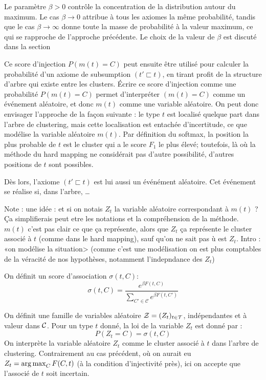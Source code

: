 Le paramètre $\beta > 0$ contrôle la concentration de la distribution autour du maximum. Le cas $\beta \rightarrow 0$ attribue à tous les axiomes la même probabilité, tandis que le cas $\beta \rightarrow \infty$ donne toute la masse de probabilité à la valeur maximum, ce qui se rapproche de l'approche précédente. Le choix de la valeur de $\beta$ est discuté dans la section 

Ce score d'injection $P(m(t) = C)$ peut ensuite être utilisé pour calculer la probabilité d'un axiome de subsumption $(t' \sqsubset t)$, en tirant profit de la structure d'arbre qui existe entre les clusters. 
Écrire ce score d'injection comme une probabilité $P(m(t) = C)$ permet d'interpréter $(m(t) = C)$ comme un événement aléatoire, et donc $m(t)$ comme une variable aléatoire. On peut donc envisager l'approche de la façon suivante : le type $t$ est localisé quelque part dans l'arbre de clustering, mais cette localisation est entachée d'incertitude, ce que modélise la variable aléatoire $m(t)$. Par définition du softmax, la position la plus probable de $t$ est le cluster qui a le score $F_1$ le plus élevé; toutefois, là où la méthode du hard mapping ne considérait pas d'autre possibilité, d'autres positions de $t$ sont possibles. 

Dès lors, l'axiome $(t' \sqsubset t)$ est lui aussi un événément aléatoire. Cet événement se réalise si, dans l'arbre, \ldots

Note : une idée : et si on notais $Z_t$ la variable aléatoire correspondant à $m(t)$ ? Ça simplifierais peut etre les notations et la compréhension de la méthode. $m(t)$ c'est pas clair ce que ça représente, alors que $Z_t$ ça représente le cluster associé à $t$ (comme dans le hard mapping), sauf qu'on ne sait pas ù est $Z_t$. Intro : «on modélise la situation> (comme c'est une modélisation on est plus comptables de la véracité de nos hypothèses, notamment l'indepndance des $Z_t$)

On définit un score d'association $\sigma(t, C)$:
\begin{equation}
    \sigma(t, C) = \frac{\displaystyle e^{ \beta F(t, C)}}{\displaystyle \sum_{C' \in \mathcal{C}} e^{\beta F(t, C')}}
\end{equation}

On définit une famille de variables aléatoire $\mathcal{Z} = (Z_t)_{t \in \mathcal{T}}$, indépendantes et à valeur dans $\mathcal{C}$. Pour un type $t$ donné, la loi de la variable $Z_t$ est donné par :
\begin{equation}
    P(Z_t = C) = \sigma(t, C)
\end{equation}
On interprète la variable aléatoire $Z_t$ comme le cluster associé à $t$ dans l'arbre de clustering. Contrairement au cas précédent, où on aurait eu $Z_t = \operatorname*{arg\,max}_C F(C, t)$ (à la condition d'injectivité près), ici on accepte que l'associé de $t$ soit incertain. 

